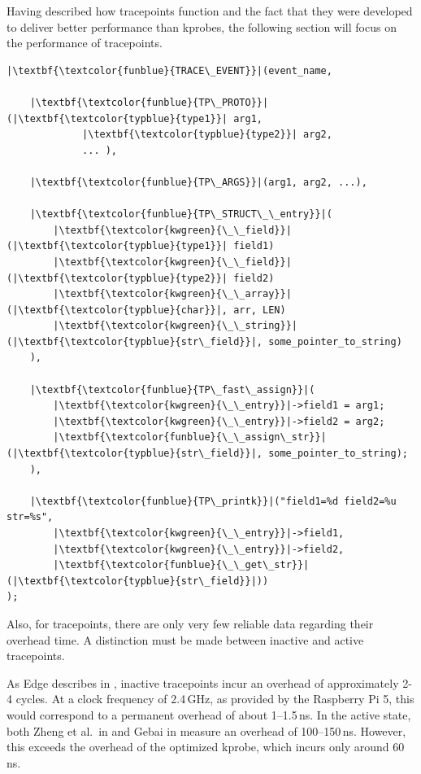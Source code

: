 Having described how tracepoints function and the fact that they were developed to deliver better performance than \acp{kprobe},  the following section will focus on the performance of tracepoints.  

\begin{listing}[H]
    \centering
\begin{verbatim}
|\textbf{\textcolor{funblue}{TRACE\_EVENT}}|(event_name,

    |\textbf{\textcolor{funblue}{TP\_PROTO}}|(|\textbf{\textcolor{typblue}{type1}}| arg1,
             |\textbf{\textcolor{typblue}{type2}}| arg2,
             ... ),

    |\textbf{\textcolor{funblue}{TP\_ARGS}}|(arg1, arg2, ...),

    |\textbf{\textcolor{funblue}{TP\_STRUCT\_\_entry}}|(
        |\textbf{\textcolor{kwgreen}{\_\_field}}|(|\textbf{\textcolor{typblue}{type1}}| field1)
        |\textbf{\textcolor{kwgreen}{\_\_field}}|(|\textbf{\textcolor{typblue}{type2}}| field2)
        |\textbf{\textcolor{kwgreen}{\_\_array}}|(|\textbf{\textcolor{typblue}{char}}|, arr, LEN)
        |\textbf{\textcolor{kwgreen}{\_\_string}}|(|\textbf{\textcolor{typblue}{str\_field}}|, some_pointer_to_string)
    ),

    |\textbf{\textcolor{funblue}{TP\_fast\_assign}}|(
        |\textbf{\textcolor{kwgreen}{\_\_entry}}|->field1 = arg1;
        |\textbf{\textcolor{kwgreen}{\_\_entry}}|->field2 = arg2;
        |\textbf{\textcolor{funblue}{\_\_assign\_str}}|(|\textbf{\textcolor{typblue}{str\_field}}|, some_pointer_to_string);
    ),

    |\textbf{\textcolor{funblue}{TP\_printk}}|("field1=%d field2=%u str=%s",
        |\textbf{\textcolor{kwgreen}{\_\_entry}}|->field1,
        |\textbf{\textcolor{kwgreen}{\_\_entry}}|->field2,
        |\textbf{\textcolor{funblue}{\_\_get\_str}}|(|\textbf{\textcolor{typblue}{str\_field}}|))
);
\end{verbatim}
\caption{Structure of Tracepoint}
\label{lst:tracepoint}
\end{listing}

Also, for tracepoints, there are only very few reliable data regarding their overhead time.  
A distinction must be made between inactive and active tracepoints.  

As Edge describes in \cite{min_imp}, inactive tracepoints incur an overhead of approximately 2-4 cycles.  
At a clock frequency of 2.4\,GHz, as provided by the Raspberry Pi 5, this would correspond to a permanent overhead of about 1–1.5\,ns.  
In the active state, both Zheng et al.\ in \cite[p.~7]{zheng2023bpftimeuserspaceebpfruntime} and Gebai in \cite[p.~26:19]{tracepoint_comp} measure an overhead of 100–150\,ns.  
However, this exceeds the overhead of the optimized \ac{kprobe}, which incurs only around 60\,ns.  

